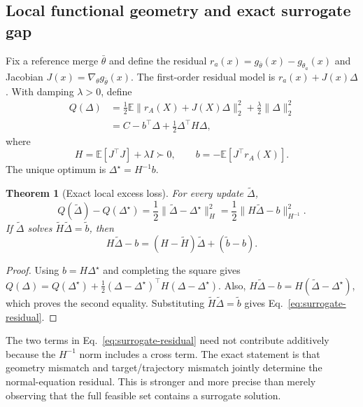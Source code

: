 \documentclass[letterpaper]{article} %
\theoremstyle{plain}
\newtheorem{theorem}{Theorem}
\theoremstyle{definition}
\begin{document}
\subsection{Local functional geometry and exact surrogate gap}
\label{app:local-gap}

Fix a reference merge $\bar\theta$ and define the residual
$r_a(x)=g_{\bar\theta}(x)-g_{\theta_a}(x)$ and Jacobian
$J(x)=\nabla_\theta g_{\bar\theta}(x)$. The first-order residual model is
$r_a(x)+J(x)\Delta$. With damping $\lambda>0$, define
\begin{align}
Q(\Delta)
&=\frac12\mathbb E\|r_A(X)+J(X)\Delta\|_2^2
  +\frac\lambda2\|\Delta\|_2^2 \\
&=C-b^\top\Delta+\frac12\Delta^\top H\Delta,
\label{eq:Q-def}
\end{align}
where
\begin{equation}
H=\mathbb E[J^\top J]+\lambda I\succ0,
\qquad
b=-\mathbb E[J^\top r_A(X)].
\label{eq:H-b}
\end{equation}
The unique optimum is $\Delta^\star=H^{-1}b$.

\begin{theorem}[Exact local excess loss]
\label{thm:exact-gap}
For every update $\widetilde\Delta$,
\begin{equation}
Q(\widetilde\Delta)-Q(\Delta^\star)
=\frac12\|\widetilde\Delta-\Delta^\star\|_H^2
=\frac12\|H\widetilde\Delta-b\|_{H^{-1}}^2.
\label{eq:exact-gap}
\end{equation}
If $\widetilde\Delta$ solves
$\widetilde H\widetilde\Delta=\widetilde b$, then
\begin{equation}
H\widetilde\Delta-b
=(H-\widetilde H)\widetilde\Delta+(\widetilde b-b).
\label{eq:surrogate-residual}
\end{equation}
\end{theorem}

\begin{proof}
Using $b=H\Delta^\star$ and completing the square gives
$Q(\Delta)=Q(\Delta^\star)+
\frac12(\Delta-\Delta^\star)^\top H(\Delta-\Delta^\star)$.
Also,
$H\widetilde\Delta-b=H(\widetilde\Delta-\Delta^\star)$, which proves the second equality.
Substituting $\widetilde H\widetilde\Delta=\widetilde b$ gives
Eq.~\eqref{eq:surrogate-residual}.
\end{proof}

The two terms in Eq.~\eqref{eq:surrogate-residual} need not contribute additively because
the $H^{-1}$ norm includes a cross term. The exact statement is that geometry mismatch
and target/trajectory mismatch jointly determine the normal-equation residual. This is
stronger and more precise than merely observing that the full feasible set contains a
surrogate solution.
\end{document}
